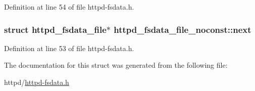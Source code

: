 Definition at line 54 of file httpd-\/fsdata.h.

\hypertarget{structhttpd__fsdata__file__noconst_aae7beec96cf003b15d8c365202c66405}{
\subsubsection[{next}]{\setlength{\rightskip}{0pt plus 5cm}struct {\bf httpd\_\-fsdata\_\-file}$\ast$ {\bf httpd\_\-fsdata\_\-file\_\-noconst::next}}}
\label{structhttpd__fsdata__file__noconst_aae7beec96cf003b15d8c365202c66405}


Definition at line 53 of file httpd-\/fsdata.h.



The documentation for this struct was generated from the following file:\begin{DoxyCompactItemize}
\item 
httpd/\hyperlink{httpd-fsdata_8h}{httpd-\/fsdata.h}\end{DoxyCompactItemize}
